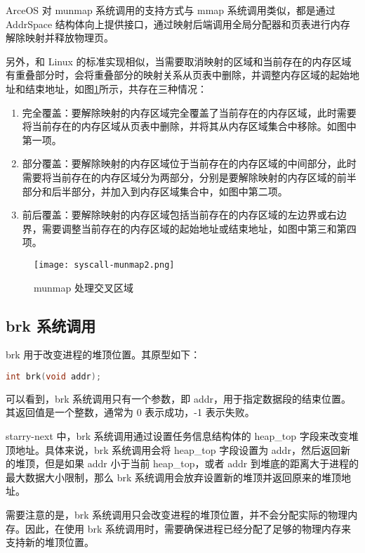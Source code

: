ArceOS 对 munmap 系统调用的支持方式与 mmap 系统调用类似，都是通过 AddrSpace 结构体向上提供接口，通过映射后端调用全局分配器和页表进行内存解除映射并释放物理页。 

另外，和 Linux 的标准实现相似，当需要取消映射的区域和当前存在的内存区域有重叠部分时，会将重叠部分的映射关系从页表中删除，并调整内存区域的起始地址和结束地址，如图\ref{fig:munmap2}所示，共存在三种情况：
\begin{enumerate}
    \item 完全覆盖：要解除映射的内存区域完全覆盖了当前存在的内存区域，此时需要将当前存在的内存区域从页表中删除，并将其从内存区域集合中移除。如图中第一项。
    \item 部分覆盖：要解除映射的内存区域位于当前存在的内存区域的中间部分，此时需要将当前存在的内存区域分为两部分，分别是要解除映射的内存区域的前半部分和后半部分，并加入到内存区域集合中，如图中第二项。
    \item 前后覆盖：要解除映射的内存区域包括当前存在的内存区域的左边界或右边界，需要调整当前存在的内存区域的起始地址或结束地址，如图中第三和第四项。
\end{enumerate}

\begin{figure}
    \centering
    \texttt{[image: syscall-munmap2.png]}
    \caption{munmap 处理交叉区域}
    \label{fig:munmap2}
\end{figure}


\subsection{brk 系统调用}

brk 用于改变进程的堆顶位置。其原型如下：

\begin{lstlisting}[language=c, caption=brk 系统调用函数原型]
int brk(void addr);
\end{lstlisting}


可以看到，brk 系统调用只有一个参数，即 addr，用于指定数据段的结束位置。
其返回值是一个整数，通常为 0 表示成功，-1 表示失败。

starry-next 中，brk 系统调用通过设置任务信息结构体的 heap\_top 字段来改变堆顶地址。具体来说，brk 系统调用会将 heap\_top 字段设置为 addr，然后返回新的堆顶，但是如果 addr 小于当前 heap\_top，或者 addr 到堆底的距离大于进程的最大数据大小限制，那么 brk 系统调用会放弃设置新的堆顶并返回原来的堆顶地址。

需要注意的是，brk 系统调用只会改变进程的堆顶位置，并不会分配实际的物理内存。因此，在使用 brk 系统调用时，需要确保进程已经分配了足够的物理内存来支持新的堆顶位置。

